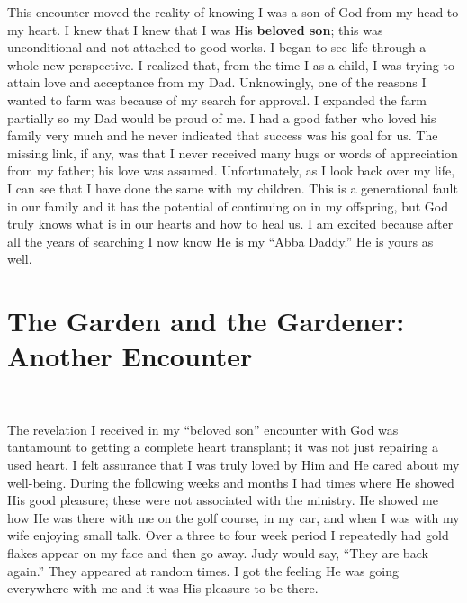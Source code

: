 \documentclass[twoside, 12pt]{book}
\begin{document}
This encounter moved the reality of knowing I was a son of God from my head to my heart. I knew that I knew that I was His \textbf{beloved son}; this was unconditional and not attached to good works. I began to see life through a whole new perspective. I realized that, from the time I as a child, I was trying to attain love and acceptance from my Dad. Unknowingly, one of the reasons I wanted to farm was because of my search for approval. I expanded the farm partially so my Dad would be proud of me. I had a good father who loved his family very much and he never indicated that success was his goal for us. The missing link, if any, was that I never received many hugs or words of appreciation from my father; his love was assumed. Unfortunately, as I look back over my life, I can see that I have done the same with my children. This is a generational fault in our family and it has the potential of continuing on in my offspring, but God truly knows what is in our hearts and how to heal us. I am excited because after all the years of searching I now know He is my  “Abba Daddy.” He is yours as well. 


\section{The Garden and the Gardener: Another Encounter}
\

The revelation I received in my “beloved son” encounter with God was tantamount to getting a complete heart transplant; it was not just repairing a used heart. I felt assurance that I was truly loved by Him and He cared about my well-being. During the following weeks and months I had times where He showed His good pleasure; these were not associated with the ministry. He showed me how He was there with me on the golf course, in my car, and when I was with my wife enjoying small talk. Over a three to four week period I repeatedly had gold flakes appear on my face and then go away. Judy would say, “They are back again.” They appeared at random times. I got the feeling He was going everywhere with me and it was His pleasure to be there.
 
\end{document}
